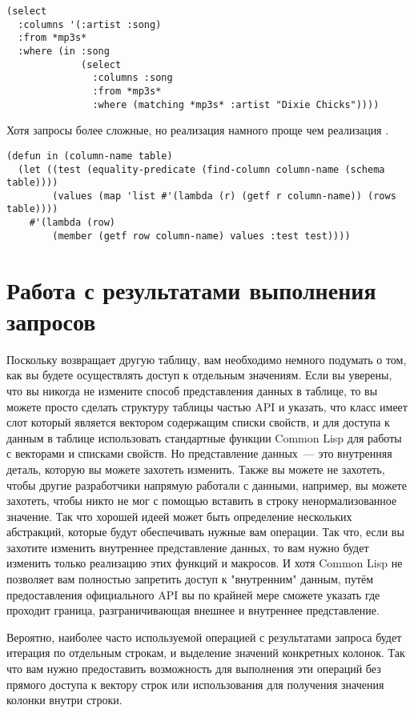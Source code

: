 \begin{lstlisting}
(select
  :columns '(:artist :song)
  :from *mp3s*
  :where (in :song 
             (select
               :columns :song
               :from *mp3s*
               :where (matching *mp3s* :artist "Dixie Chicks"))))
\end{lstlisting}

Хотя запросы более сложные, но реализация  намного проще чем реализация
.

\begin{lstlisting}
(defun in (column-name table)
  (let ((test (equality-predicate (find-column column-name (schema table))))
        (values (map 'list #'(lambda (r) (getf r column-name)) (rows table))))
    #'(lambda (row)
        (member (getf row column-name) values :test test))))
\end{lstlisting}

\section{Работа с результатами выполнения запросов}

Поскольку  возвращает другую таблицу, вам необходимо немного подумать о том,
как вы будете осуществлять доступ к отдельным значениям.  Если вы уверены, что вы никогда
не измените способ представления данных в таблице, то вы можете просто сделать структуру
таблицы частью API и указать, что класс  имеет слот  который
является вектором содержащим списки свойств, и для доступа к данным в таблице использовать
стандартные функции Common Lisp для работы с векторами и списками свойств.  Но
представление данных~--- это внутренняя деталь, которую вы можете захотеть изменить.
Также вы можете не захотеть, чтобы другие разработчики напрямую работали с данными,
например, вы можете захотеть, чтобы никто не мог с помощью  вставить в строку
ненормализованное значение.  Так что хорошей идеей может быть определение нескольких
абстракций, которые будут обеспечивать нужные вам операции.  Так что, если вы захотите
изменить внутреннее представление данных, то вам нужно будет изменить только реализацию
этих функций и макросов.  И хотя Common Lisp не позволяет вам полностью запретить доступ к
"внутренним" данным, путём предоставления официального API вы по крайней мере сможете
указать где проходит граница, разграничивающая внешнее и внутреннее представление.

Вероятно, наиболее часто используемой операцией с результатами запроса будет итерация по
отдельным строкам, и выделение значений конкретных колонок.  Так что вам нужно
предоставить возможность для выполнения эти операций без прямого доступа к вектору строк
или использования  для получения значения колонки внутри строки.


